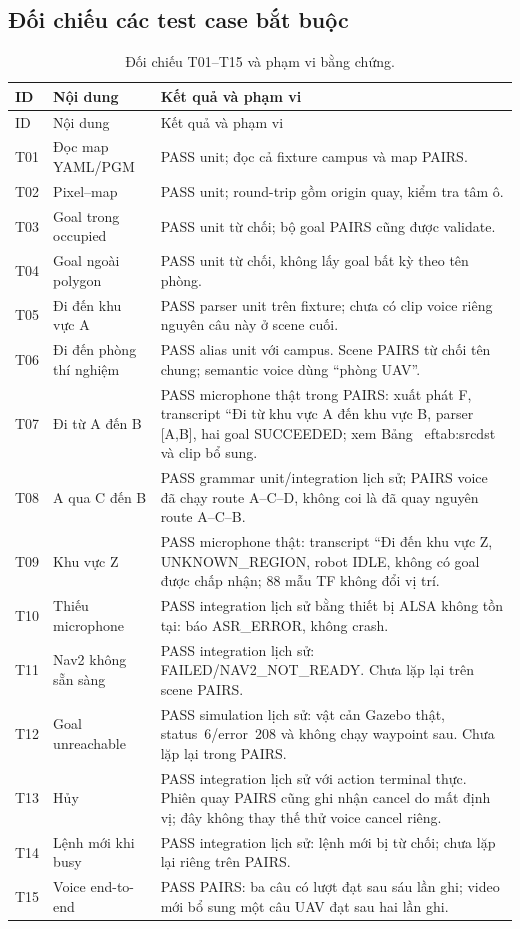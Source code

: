 \documentclass[12pt,a4paper]{article}
\begin{document}
\subsection{Đối chiếu các test case bắt buộc}
\small
\begin{longtable}{@{}p{0.8cm}p{4.1cm}p{9.2cm}@{}}
\caption{Đối chiếu T01--T15 và phạm vi bằng chứng.}\label{tab:testmatrix}\\
\toprule ID & Nội dung & Kết quả và phạm vi \\
\midrule\endfirsthead
\toprule ID & Nội dung & Kết quả và phạm vi \\
\midrule\endhead
\bottomrule\endfoot
T01 & Đọc map YAML/PGM & PASS unit; đọc cả fixture campus và map PAIRS. \\
T02 & Pixel--map & PASS unit; round-trip gồm origin quay, kiểm tra tâm ô. \\
T03 & Goal trong occupied & PASS unit từ chối; bộ goal PAIRS cũng được validate. \\
T04 & Goal ngoài polygon & PASS unit từ chối, không lấy goal bất kỳ theo tên phòng. \\
T05 & Đi đến khu vực A & PASS parser unit trên fixture; chưa có clip voice riêng nguyên câu này ở scene cuối. \\
T06 & Đi đến phòng thí nghiệm & PASS alias unit với campus. Scene PAIRS từ chối tên chung; semantic voice dùng ``phòng UAV''. \\
T07 & Đi từ A đến B & PASS microphone thật trong PAIRS: xuất phát F, transcript ``Đi từ khu vực A đến khu vực B, parser [A,B], hai goal SUCCEEDED; xem Bảng~
ef{tab:srcdst} và clip bổ sung. \\
T08 & A qua C đến B & PASS grammar unit/integration lịch sử; PAIRS voice đã chạy route A--C--D, không coi là đã quay nguyên route A--C--B. \\
T09 & Khu vực Z & PASS microphone thật: transcript ``Đi đến khu vực Z, UNKNOWN\_REGION, robot IDLE, không có goal được chấp nhận; 88 mẫu TF không đổi vị trí. \\
T10 & Thiếu microphone & PASS integration lịch sử bằng thiết bị ALSA không tồn tại: báo ASR\_ERROR, không crash. \\
T11 & Nav2 không sẵn sàng & PASS integration lịch sử: FAILED/NAV2\_NOT\_READY. Chưa lặp lại trên scene PAIRS. \\
T12 & Goal unreachable & PASS simulation lịch sử: vật cản Gazebo thật, status~6/error~208 và không chạy waypoint sau. Chưa lặp lại trong PAIRS. \\
T13 & Hủy & PASS integration lịch sử với action terminal thực. Phiên quay PAIRS cũng ghi nhận cancel do mất định vị; đây không thay thế thử voice cancel riêng. \\
T14 & Lệnh mới khi busy & PASS integration lịch sử: lệnh mới bị từ chối; chưa lặp lại riêng trên PAIRS. \\
T15 & Voice end-to-end & PASS PAIRS: ba câu có lượt đạt sau sáu lần ghi; video mới bổ sung một câu UAV đạt sau hai lần ghi. \\
\end{longtable}
\end{document}
